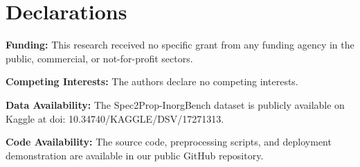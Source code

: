 \section*{Declarations}

\textbf{Funding:} This research received no specific grant from any funding agency in the public, commercial, or not-for-profit sectors.

\textbf{Competing Interests:} The authors declare no competing interests.

\textbf{Data Availability:} The Spec2Prop-InorgBench dataset is publicly available on Kaggle at doi: 10.34740/KAGGLE/DSV/17271313.

\textbf{Code Availability:} The source code, preprocessing scripts, and deployment demonstration are available in our public GitHub repository.
